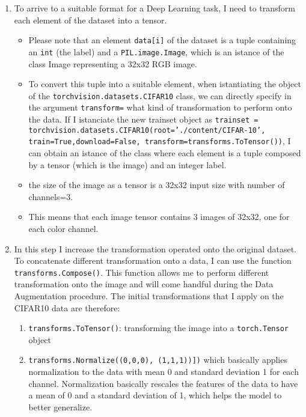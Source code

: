 \documentclass[a4paper]{article}
\begin{document}
\begin{enumerate}
	\item To arrive to a suitable format for a Deep Learning task, I need to transform each element of the dataset into a tensor. 
    \begin{itemize}
	    \item Please note that an element \texttt{data[i]} of the dataset is a tuple containing an \texttt{int} (the label) and a \texttt{PIL.image.Image}, which is an istance of the class Image representing a 32x32 RGB image.
        \item To convert this tuple into a suitable element, when istantiating the object of the \texttt{torchvision.datasets.CIFAR10} class, we can directly specify in the argument \texttt{transform=} what kind of transformation to perform onto the data. If I istanciate the new trainset object as \newline \texttt{trainset = torchvision.datasets.CIFAR10(root='./content/CIFAR-10', train=True,download=False, transform=transforms.ToTensor())}, I can obtain an istance of the class where each element is a tuple composed by a tensor (which is the image) and an integer label.
        \item  the size of the image as a tensor is a 32x32 input size with number of channels=3.
        \item This means that each image tensor contains 3 images of 32x32, one for each color channel. 
	\end{itemize}
	\item In this step I increase the transformation operated onto the original dataset. To concatenate different transformation onto a data, I can use the function \texttt{transforms.Compose()}. This function allows me to perform different transformation onto the image and will come handful during the Data Augmentation procedure. The initial transformations that I apply on the CIFAR10 data are therefore:
    \begin{enumerate}
        \item \texttt{transforms.ToTensor()}: transforming the image into a \texttt{torch.Tensor} object
        \item \texttt{transforms.Normalize((0,0,0), (1,1,1))])} which basically applies normalization to the data with mean 0 and standard deviation 1 for each channel. Normalization basically rescales the features of the data to have a mean of 0 and a standard deviation of 1, which helps the model to better generalize.
    \end{enumerate}
	

\end{enumerate}
\end{document}

